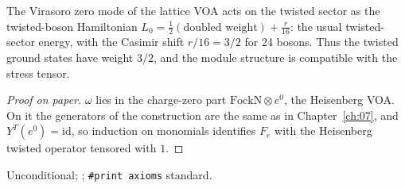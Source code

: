 \begin{physics}
The Virasoro zero mode of the lattice VOA acts on the twisted sector as the twisted-boson Hamiltonian $L_0=\frac12(\text{doubled weight})+\frac{r}{16}$: the usual twisted-sector energy, with the Casimir shift $r/16=3/2$ for 24 bosons. Thus the twisted ground states have weight $3/2$, and the module structure is compatible with the stress tensor.
\end{physics}
\begin{proof}[Proof on paper]
$\omega$ lies in the charge-zero part $\mathrm{FockN}\otimes e^0$, the Heisenberg VOA.  On it the
generators of the construction are the same as in Chapter~\ref{ch:07}, and $Y^T(e^0)=\mathrm{id}$, so
induction on monomials identifies $F_e$ with the Heisenberg twisted operator tensored with $1$.
\end{proof}
\begin{status}
Unconditional; ; \texttt{\#print axioms}  standard.
\end{status}


